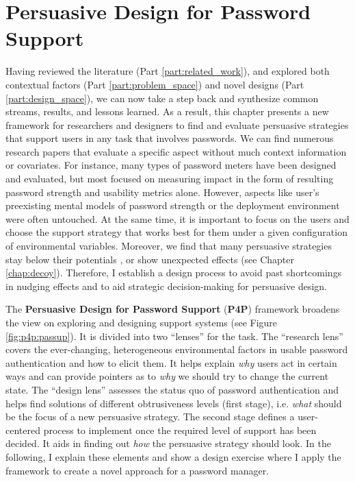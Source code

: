 
\chapter[Persuasive Design for Password Support (P4P)]{Persuasive Design for Password Support}\label{chap:perdespassup}
Having reviewed the literature (Part \ref{part:related_work}), and explored both contextual factors (Part \ref{part:problem_space}) and novel designs (Part \ref{part:design_space}), we can now take a step back and synthesize common streams, results, and lessons learned. 
As a result, this chapter presents a new framework for researchers and designers to find and evaluate persuasive strategies that support users in any task that involves passwords. 
We can find numerous research papers that evaluate a specific aspect without much context information or covariates. For instance, many types of password meters have been designed and evaluated, but most focused on measuring impact in the form of resulting password strength and usability metrics alone. However, aspects like user's preexisting mental models of password strength or the deployment environment were often untouched. At the same time, it is important to focus on the users and choose the support strategy that works best for them under a given configuration of environmental variables. 
Moreover, we find that many persuasive strategies stay below their potentials \cite{Renaud2017LessonsLearnedNudges}, or show unexpected effects (see Chapter \ref{chap:decoy}). Therefore, I establish a design process to avoid past shortcomings in nudging effects and to aid strategic decision-making for persuasive design. 


The \textbf{Persuasive Design for Password Support} (\textbf{P4P}) framework broadens the view on exploring and designing support systems (see Figure \ref{fig:p4p:passup}). It is divided into two ``lenses'' for the task. The ``research lens'' covers the ever-changing, heterogeneous environmental factors in usable password authentication and how to elicit them. It helps explain \textit{why} users act in certain ways and can provide pointers as to \textit{why} we should try to change the current state. The ``design lens'' assesses the status quo of password authentication and helps find solutions of different obtrusiveness levels (first stage), i.e. \textit{what} should be the focus of a new persuasive strategy. The second stage defines a user-centered process to implement once the required level of support has been decided. It aids in finding out \textit{how} the persuasive strategy should look. In the following, I explain these elements and show a design exercise where I apply the framework to create a novel approach for a password manager. 

